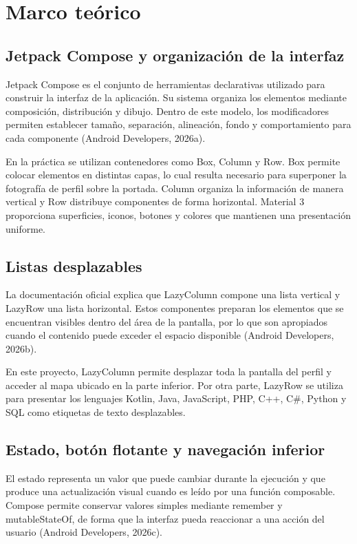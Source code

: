 \documentclass[12pt,a4paper]{article}
\begin{document}
\section{Marco teórico}

\subsection{Jetpack Compose y organización de la interfaz}

Jetpack Compose es el conjunto de herramientas declarativas utilizado para construir la interfaz de la aplicación. Su sistema organiza los elementos mediante composición, distribución y dibujo. Dentro de este modelo, los modificadores permiten establecer tamaño, separación, alineación, fondo y comportamiento para cada componente (Android Developers, 2026a).

En la práctica se utilizan contenedores como Box, Column y Row. Box permite colocar elementos en distintas capas, lo cual resulta necesario para superponer la fotografía de perfil sobre la portada. Column organiza la información de manera vertical y Row distribuye componentes de forma horizontal. Material 3 proporciona superficies, iconos, botones y colores que mantienen una presentación uniforme.

\subsection{Listas desplazables}

La documentación oficial explica que LazyColumn compone una lista vertical y LazyRow una lista horizontal. Estos componentes preparan los elementos que se encuentran visibles dentro del área de la pantalla, por lo que son apropiados cuando el contenido puede exceder el espacio disponible (Android Developers, 2026b).

En este proyecto, LazyColumn permite desplazar toda la pantalla del perfil y acceder al mapa ubicado en la parte inferior. Por otra parte, LazyRow se utiliza para presentar los lenguajes Kotlin, Java, JavaScript, PHP, C++, C\#, Python y SQL como etiquetas de texto desplazables.

\subsection{Estado, botón flotante y navegación inferior}

El estado representa un valor que puede cambiar durante la ejecución y que produce una actualización visual cuando es leído por una función composable. Compose permite conservar valores simples mediante remember y mutableStateOf, de forma que la interfaz pueda reaccionar a una acción del usuario (Android Developers, 2026c).
\end{document}
